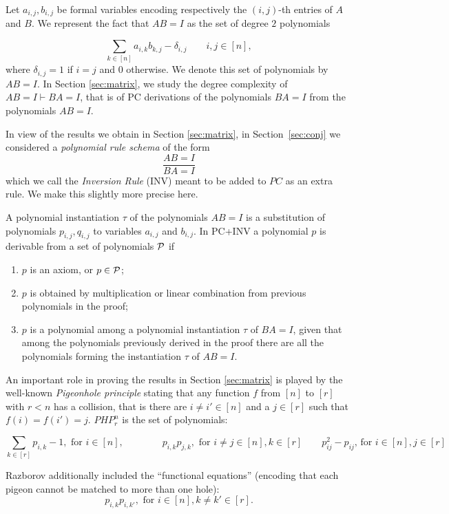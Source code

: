 Let $a_{i,j},b_{i,j}$ be formal variables 
 encoding respectively  the $(i,j)$-th entries of $A$ and $B$.  We represent the fact that $AB=I$ as the set of degree $2$ polynomials

$$
\sum_{k \in [n]} a_{i,k}b_{k,j} - \delta_{i,j}\qquad i,j \in [n],
$$
where $\delta_{i,j}=1$ if $i=j$ and $0$ otherwise. We denote this set of polynomials by $AB=I$. In Section \ref{sec:matrix}, we study the degree complexity of  $AB=I \vdash BA=I$, that is of PC derivations of the polynomials $BA=I$ from the polynomials $AB=I$. 

\medskip

In view of the results we obtain in Section \ref{sec:matrix}, in Section~\ref{sec:conj} we considered a  {\em polynomial rule schema} of the form 
$$
\frac{AB=I}{BA=I}
$$
which we call the {\em Inversion Rule} (INV) meant to be added to $PC$ as an extra rule. We make this slightly more precise here.

A polynomial instantiation $\tau$ of the polynomials $AB=I$ is a substitution of polynomials $p_{i,j},q_{i,j}$ to variables $a_{i,j}$ and $b_{i,j}$.   
In PC+INV a polynomial $p$ is derivable from a set of polynomials
${\cal P}$ if 
\begin{enumerate}
\item $p$ is an axiom, or $p \in {\cal P}$;
\item $p$ is obtained by multiplication or linear combination from previous polynomials in the proof;
\item $p$ is a polynomial among a polynomial instantiation $\tau$ of $BA=I$, given that among the polynomials previously derived  in the proof there are all the polynomials 
forming the instantiation $\tau$ of $AB=I$.
\end{enumerate}

\medskip

 An important role in proving the results in Section \ref{sec:matrix} is played by the well-known {\em Pigeonhole principle} stating that  any function $f$ from $[n]$ to $[r]$ with $r<n$ has a collision, that is there are $i \not= i' \in [n]$ and a $j\in[r]$ such that $f(i)=f(i')=j$. $PHP^n_r$ is the set of polynomials:

$$
\sum_{k\in [r]}p_{i,k} -1, \mbox{ for } i \in [n], \qquad \qquad p_{i,k}p_{j,k}, \mbox{ for } i \not= j \in [n], k \in [r] \qquad p_{ij}^2 - p_{ij} \text{, for $i \in [n], j \in [r]$} 
$$

Razborov \cite{DBLP:journals/cc/Razborov98} additionally included the ``functional equations'' (encoding that each pigeon cannot be matched to more than one hole):
\[
p_{i,k} p_{i,k'}, \mbox{ for } i \in [n], k \neq k' \in [r].
\]

\medskip



